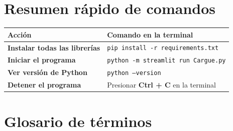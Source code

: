 \documentclass[12pt, letterpaper]{article}
\begin{document}
\section{Resumen rápido de comandos}

\begin{center}
\begin{tabular}{>{\bfseries}m{5.5cm} m{8cm}}
  \toprule
  \textcolor{uninorteazul}{Acción} & \textcolor{uninorteazul}{Comando en la terminal} \\
  \midrule
  Instalar todas las librerías & \texttt{pip install -r requirements.txt} \\
  \addlinespace
  Iniciar el programa & \texttt{python -m streamlit run Cargue.py} \\
  \addlinespace
  Ver versión de Python & \texttt{python --version} \\
  \addlinespace
  Detener el programa & Presionar \textbf{Ctrl + C} en la terminal \\
  \bottomrule
\end{tabular}
\end{center}

\section{Glosario de términos}
\end{document}
